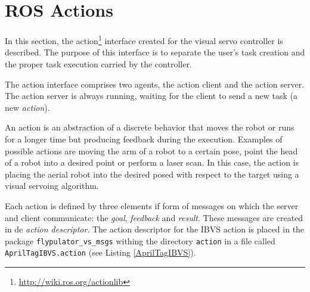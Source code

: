 \section{ROS Actions}
\label{sec:ros_actions}

In this section, the action\footnote{\url{http://wiki.ros.org/actionlib}} interface created for the visual servo controller is described. The purpose of this interface is to separate the user's task creation and the proper task execution carried  by the controller.

The action interface comprises two agents, the action client and the action server. The action server is always running, waiting for the client to send a new task (a new \emph{action}).

An action \cite{ROS_ComPat} is an abstraction of a discrete behavior that moves the robot or runs for a longer time but producing feedback during the execution. Examples of possible actions are moving the arm of a robot to a certain pose, point the head of a robot into a desired point or perform a laser scan. In this case, the action is placing the aerial robot into the desired posed with respect to the target using a visual servoing algorithm.

 Each action is defined by three elements if form of messages on which the server and client communicate: the \emph{goal}, \emph{feedback} and \emph{result}. These messages are created in de \emph{action descriptor}. The action descriptor for the IBVS action is placed in the package \texttt{flypulator\_vs\_msgs} withing the directory \texttt{action} in a file called \texttt{AprilTagIBVS.action} (see Listing \ref{AprilTagIBVS}).

